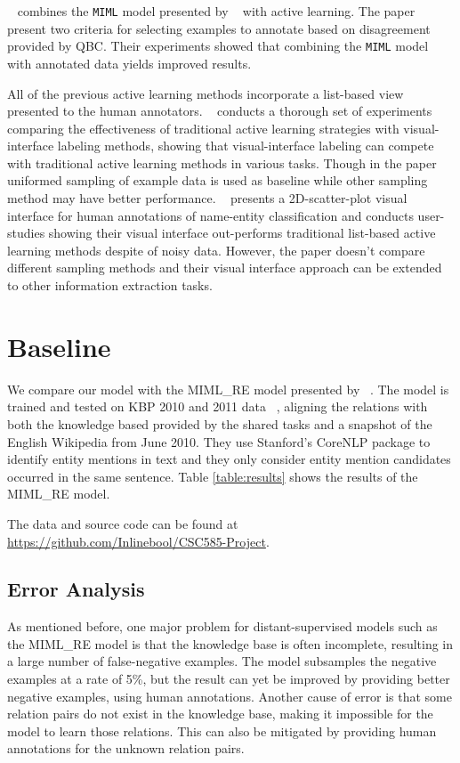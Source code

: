 \documentclass[11pt,a4paper]{article}
\begin{document}
    ~\citet{angeli2014combining} combines the \texttt{MIML} model presented by ~\citet{surdeanu2012multi} with active learning. The paper present two criteria for selecting examples to annotate based on disagreement provided by QBC. Their experiments showed that combining the \texttt{MIML} model with annotated data yields improved results.

    All of the previous active learning methods incorporate a list-based view presented to the human annotators. ~\citet{bernard2018comparing} conducts a thorough set of experiments comparing the effectiveness of traditional active learning strategies with visual-interface labeling methods, showing that visual-interface labeling can compete with traditional active learning methods in various tasks. Though in the paper uniformed sampling of example data is used as baseline while other sampling method may have better performance. ~\citet{berger2014visual} presents a 2D-scatter-plot visual interface for human annotations of name-entity classification and conducts user-studies showing their visual interface out-performs traditional list-based active learning methods despite of noisy data. However, the paper doesn't compare different sampling methods and their visual interface approach can be extended to other information extraction tasks.
  \section{Baseline}
    We compare our model with the MIML\_RE model presented by ~\citet{surdeanu2012multi}. The model is trained and tested on KBP 2010 and 2011 data ~\cite{ji2010overview, ji2011overview}, aligning the relations with both the knowledge based provided by the shared tasks and a snapshot of the English Wikipedia from June 2010. They use Stanford's CoreNLP package to identify entity mentions in text and they only consider entity mention candidates occurred in the same sentence. Table \ref{table:results} shows the results of the MIML\_RE model.
    
    The data and source code can be found at \url{https://github.com/Inlinebool/CSC585-Project}.
  \subsection{Error Analysis}
    As mentioned before, one major problem for distant-supervised models such as the MIML\_RE model is that the knowledge base is often incomplete, resulting in a large number of false-negative examples. The model subsamples the negative examples at a rate of 5\%, but the result can yet be improved by providing better negative examples, using human annotations.
    Another cause of error is that some relation pairs do not exist in the knowledge base, making it impossible for the model to learn those relations. This can also be mitigated by providing human annotations for the unknown relation pairs.
    
\end{document}
